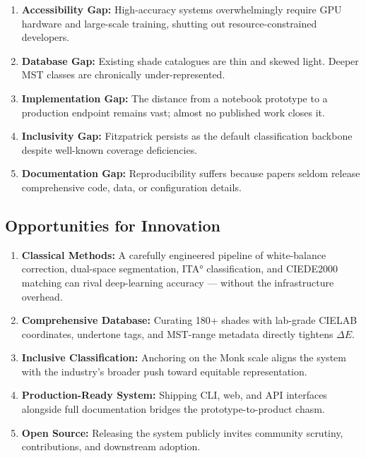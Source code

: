 \begin{enumerate}
    \item \textbf{Accessibility Gap:} High-accuracy systems overwhelmingly require GPU hardware and large-scale training, shutting out resource-constrained developers.
    
    \item \textbf{Database Gap:} Existing shade catalogues are thin and skewed light. Deeper MST classes are chronically under-represented.
    
    \item \textbf{Implementation Gap:} The distance from a notebook prototype to a production endpoint remains vast; almost no published work closes it.
    
    \item \textbf{Inclusivity Gap:} Fitzpatrick persists as the default classification backbone despite well-known coverage deficiencies.
    
    \item \textbf{Documentation Gap:} Reproducibility suffers because papers seldom release comprehensive code, data, or configuration details.
\end{enumerate}

\subsection{Opportunities for Innovation}

\begin{enumerate}
    \item \textbf{Classical Methods:} A carefully engineered pipeline of white-balance correction, dual-space segmentation, ITA° classification, and CIEDE2000 matching can rival deep-learning accuracy — without the infrastructure overhead.
    
    \item \textbf{Comprehensive Database:} Curating 180+ shades with lab-grade CIELAB coordinates, undertone tags, and MST-range metadata directly tightens $\Delta E$.
    
    \item \textbf{Inclusive Classification:} Anchoring on the Monk scale aligns the system with the industry's broader push toward equitable representation.
    
    \item \textbf{Production-Ready System:} Shipping CLI, web, and API interfaces alongside full documentation bridges the prototype-to-product chasm.
    
    \item \textbf{Open Source:} Releasing the system publicly invites community scrutiny, contributions, and downstream adoption.
\end{enumerate}

